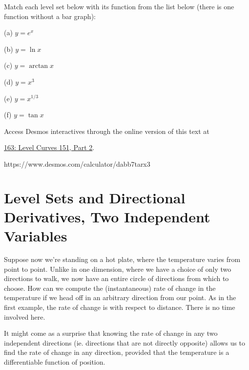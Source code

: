 \documentclass{ximera}
\begin{document}
\begin{exploration} \label{Edsft45t5}
Match each level set below with its function from the list below (there is one function without a bar graph):

(a) $y=e^x$

(b) $y=\ln x$

(c) $y=\arctan x$

(d) $y=x^3$

(e) $y=x^{1/3}$

(f) $y=\tan x$

 
\begin{onlineOnly}
    \begin{center}
\end{center}
\end{onlineOnly}

Access Desmos interactives through the online version of this text at
 
\href{https://www.desmos.com/calculator/qhto2obz1x}{163: Level Curves 151, Part 2}.

https://www.desmos.com/calculator/dabb7tarx3
\end{exploration}



\section{Level Sets and Directional Derivatives, Two Independent Variables}

Suppose now we're standing on a hot plate, where the temperature varies from point to point. Unlike in one dimension, where we have a  choice of only two directions to walk, we now have an entire circle of directions from which to choose. How can we compute the (instantaneous) rate of change in the temperature if we head off in an arbitrary direction from our point. As in the first example, the rate of change is with respect to distance. There is no time involved here.

It might come as a surprise that knowing the rate of change in any two independent directions (ie. directions that are not directly opposite) allows us to find the rate of change in any direction, provided that the temperature is a differentiable function of position.
\end{document}
